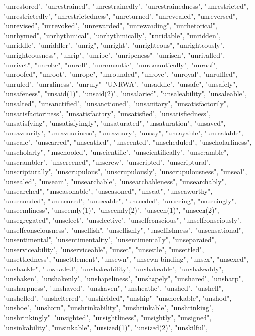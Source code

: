 "unrestored",
"unrestrained",
"unrestrainedly",
"unrestrainedness",
"unrestricted",
"unrestrictedly",
"unrestrictedness",
"unreturned",
"unrevealed",
"unreversed",
"unrevised",
"unrevoked",
"unrewarded",
"unrewarding",
"unrhetorical",
"unrhymed",
"unrhythmical",
"unrhythmically",
"unridable",
"unridden",
"unriddle",
"unriddler",
"unrig",
"unright",
"unrighteous",
"unrighteously",
"unrighteousness",
"unrip",
"unripe",
"unripeness",
"unrisen",
"unrivalled",
"unrivet",
"unrobe",
"unroll",
"unromantic",
"unromantically",
"unroof",
"unroofed",
"unroot",
"unrope",
"unrounded",
"unrove",
"unroyal",
"unruffled",
"unruled",
"unruliness",
"unruly",
"UNRWA",
"unsaddle",
"unsafe",
"unsafely",
"unsafeness",
"unsaid(1)",
"unsaid(2)",
"unsalaried",
"unsaleability",
"unsaleable",
"unsalted",
"unsanctified",
"unsanctioned",
"unsanitary",
"unsatisfactorily",
"unsatisfactoriness",
"unsatisfactory",
"unsatisfied",
"unsatisfiedness",
"unsatisfying",
"unsatisfyingly",
"unsaturated",
"unsaturation",
"unsaved",
"unsavourily",
"unsavouriness",
"unsavoury",
"unsay",
"unsayable",
"unscalable",
"unscale",
"unscarred",
"unscathed",
"unscented",
"unscheduled",
"unscholarliness",
"unscholarly",
"unschooled",
"unscientific",
"unscientifically",
"unscramble",
"unscrambler",
"unscreened",
"unscrew",
"unscripted",
"unscriptural",
"unscripturally",
"unscrupulous",
"unscrupulously",
"unscrupulousness",
"unseal",
"unsealed",
"unseam",
"unsearchable",
"unsearchableness",
"unsearchably",
"unsearched",
"unseasonable",
"unseasoned",
"unseat",
"unseaworthy",
"unseconded",
"unsecured",
"unseeable",
"unseeded",
"unseeing",
"unseeingly",
"unseemliness",
"unseemly(1)",
"unseemly(2)",
"unseen(1)",
"unseen(2)",
"unsegregated",
"unselect",
"unselective",
"unselfconscious",
"unselfconsciously",
"unselfconsciousness",
"unselfish",
"unselfishly",
"unselfishness",
"unsensational",
"unsentimental",
"unsentimentality",
"unsentimentally",
"unseparated",
"unserviceability",
"unserviceable",
"unset",
"unsettle",
"unsettled",
"unsettledness",
"unsettlement",
"unsewn",
"unsewn binding",
"unsex",
"unsexed",
"unshackle",
"unshaded",
"unshakeability",
"unshakeable",
"unshakeably",
"unshaken",
"unshakenly",
"unshapeliness",
"unshapely",
"unshared",
"unsharp",
"unsharpness",
"unshaved",
"unshaven",
"unsheathe",
"unshed",
"unshell",
"unshelled",
"unsheltered",
"unshielded",
"unship",
"unshockable",
"unshod",
"unshoe",
"unshorn",
"unshrinkability",
"unshrinkable",
"unshrinking",
"unshrinkingly",
"unsighted",
"unsightliness",
"unsightly",
"unsigned",
"unsinkability",
"unsinkable",
"unsized(1)",
"unsized(2)",
"unskilful",
